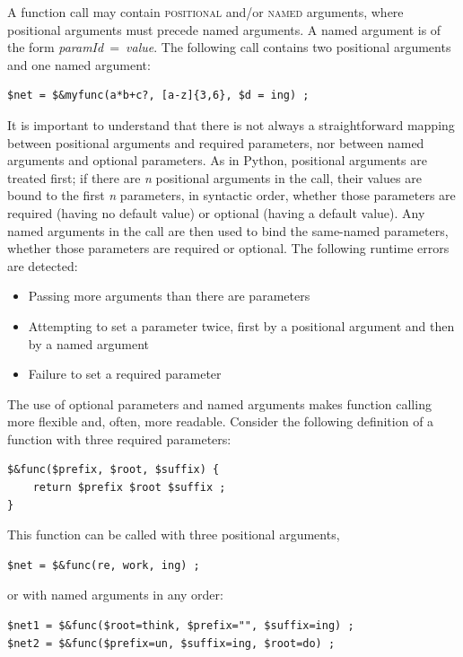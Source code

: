 \documentclass[letterpaper,12pt]{article}
\newcommand{\acro}{\textsc}
\begin{document}
A function call may contain \acro{positional} and/or \acro{named}
arguments, where positional arguments must precede named arguments.  A
named argument is of the form \emph{paramId}~=~\emph{value}.
The following call contains two positional arguments and one named
argument:

\begin{Verbatim}[fontsize=\small]
$net = $&myfunc(a*b+c?, [a-z]{3,6}, $d = ing) ;
\end{Verbatim}

\noindent
It is important to understand that there is not always a straightforward mapping
between positional arguments and required parameters, nor between named
arguments and optional parameters.  As in Python, positional arguments
are treated first; if there are \emph{n} positional arguments in the
call, their
values are bound to the first \emph{n} parameters, in syntactic order,
whether those
parameters are required (having no default value) or optional (having a
default value).  Any named arguments in the call are then used
to bind the same-named parameters, whether those parameters are
required or optional.  The following runtime errors are detected:

\begin{itemize}
\item
Passing more arguments than there are parameters
\item
Attempting to set a parameter twice, first by a positional argument and
then by a named argument
\item
Failure to set a required parameter
\end{itemize}

The use of optional parameters and named arguments makes function calling more flexible and,
often, more readable.  Consider the following definition of a function
with three required parameters:

\begin{Verbatim}[fontsize=\small]
$&func($prefix, $root, $suffix) {
	return $prefix $root $suffix ;
}
\end{Verbatim}

\noindent
This function can be called with three positional arguments,

\begin{Verbatim}[fontsize=\small]
$net = $&func(re, work, ing) ;
\end{Verbatim}

\noindent
or with named arguments in any order:

\begin{Verbatim}[fontsize=\small]
$net1 = $&func($root=think, $prefix="", $suffix=ing) ;
$net2 = $&func($prefix=un, $suffix=ing, $root=do) ;
\end{Verbatim}
\end{document}

